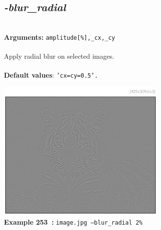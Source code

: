 \documentclass[a4paper,11pt,twoside]{book}
\begin{document}
\subsection{\emph{-blur\_radial} }\vspace*{-0.5em}
~\\\textbf{Arguments: } 
{\small \texttt{amplitude[\%],\_cx,\_cy}}\\~\\
Apply radial blur on selected images.
~\\~\\\textbf{Default values}: {\small \texttt{'cx=cy=0.5'.}}
\begin{center}\includegraphics[keepaspectratio=true,height=7cm,width=\textwidth]{img/gmic_def253.jpg}\\
{\footnotesize \textbf{Example 253~:} \texttt{image.jpg --blur\_radial 2\%}}
\end{center}
\end{document}
